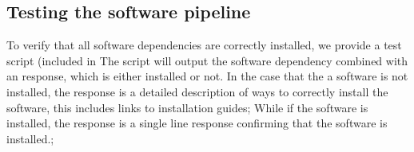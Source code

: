 \subsection{Testing the software pipeline}
\label{sec:chp2:tools:testing}

To verify that all software dependencies are correctly installed, we
provide a test script (included in \:
The script will output the software dependency combined with an response, which is either installed or not.
In the case that the a software is not installed, the response is a detailed description of ways to correctly install the software, this includes links to installation guides; 
While if the software is installed, the response is a single line response confirming that the software is installed.;


